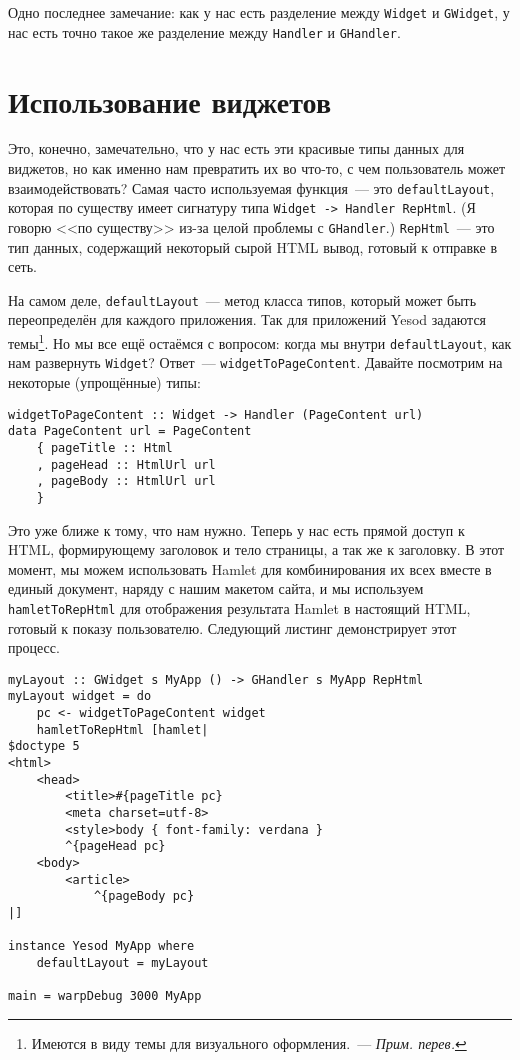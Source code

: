 Одно последнее замечание: как у нас есть разделение между \lstinline'Widget' и
\lstinline'GWidget', у нас есть точно такое же разделение между
\lstinline'Handler' и \lstinline'GHandler'.

\section{Использование виджетов}
Это, конечно, замечательно, что у нас есть эти красивые типы данных для виджетов,
но как именно нам превратить их во что-то, с чем пользователь может
взаимодействовать? Самая часто используемая функция~--- это
\lstinline'defaultLayout', которая по существу имеет сигнатуру типа
\lstinline'Widget -> Handler RepHtml'. (Я говорю <<по существу>> из-за целой
проблемы с \lstinline'GHandler'.) \lstinline'RepHtml'~--- это тип данных,
содержащий некоторый сырой HTML вывод, готовый к отправке в сеть.

На самом деле, \lstinline'defaultLayout'~--- метод класса типов, который может
быть переопределён для каждого приложения. Так для приложений Yesod задаются
темы\footnote{Имеются в виду темы для визуального оформления.~--- \emph{Прим.
перев.}}. Но мы все ещё остаёмся с вопросом: когда мы внутри
\lstinline'defaultLayout', как нам развернуть \lstinline'Widget'? Ответ~---
\lstinline'widgetToPageContent'. Давайте посмотрим на некоторые (упрощённые)
типы:
\begin{lstlisting}
widgetToPageContent :: Widget -> Handler (PageContent url)
data PageContent url = PageContent
    { pageTitle :: Html
    , pageHead :: HtmlUrl url
    , pageBody :: HtmlUrl url
    }
\end{lstlisting}

Это уже ближе к тому, что нам нужно. Теперь у нас есть прямой доступ к HTML,
формирующему заголовок и тело страницы, а так же к заголовку. В этот момент, мы
можем использовать Hamlet для комбинирования их всех вместе в единый документ,
наряду с нашим макетом сайта, и мы используем \lstinline'hamletToRepHtml' для
отображения результата Hamlet в настоящий HTML, готовый к показу пользователю.
Следующий листинг демонстрирует этот процесс.
\begin{lstlisting}[caption={Использование \lstinline'widgetToPageContent'}]
myLayout :: GWidget s MyApp () -> GHandler s MyApp RepHtml
myLayout widget = do
    pc <- widgetToPageContent widget
    hamletToRepHtml [hamlet|
$doctype 5
<html>
    <head>
        <title>#{pageTitle pc}
        <meta charset=utf-8>
        <style>body { font-family: verdana }
        ^{pageHead pc}
    <body>
        <article>
            ^{pageBody pc}
|]

instance Yesod MyApp where
    defaultLayout = myLayout

main = warpDebug 3000 MyApp
\end{lstlisting}

